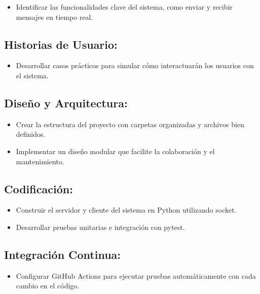 \documentclass[
  a4paper,
  DIV=11,
  numbers=noendperiod,
  onepage,
  openany]{scrreprt}
\providecommand{\tightlist}{%
  \setlength{\itemsep}{0pt}\setlength{\parskip}{0pt}}\usepackage{longtable,booktabs,array}
\begin{document}
\begin{itemize}
\tightlist
\item
  Identificar las funcionalidades clave del sistema, como enviar y
  recibir mensajes en tiempo real.
\end{itemize}

\subsection{Historias de Usuario:}\label{historias-de-usuario}

\begin{itemize}
\tightlist
\item
  Desarrollar casos prácticos para simular cómo interactuarán los
  usuarios con el sistema.
\end{itemize}

\subsection{Diseño y Arquitectura:}\label{diseuxf1o-y-arquitectura}

\begin{itemize}
\tightlist
\item
  Crear la estructura del proyecto con carpetas organizadas y archivos
  bien definidos.
\item
  Implementar un diseño modular que facilite la colaboración y el
  mantenimiento.
\end{itemize}

\subsection{Codificación:}\label{codificaciuxf3n}

\begin{itemize}
\tightlist
\item
  Construir el servidor y cliente del sistema en Python utilizando
  socket.
\item
  Desarrollar pruebas unitarias e integración con pytest.
\end{itemize}

\subsection{Integración Continua:}\label{integraciuxf3n-continua}

\begin{itemize}
\tightlist
\item
  Configurar GitHub Actions para ejecutar pruebas automáticamente con
  cada cambio en el código.
\end{itemize}
\end{document}
